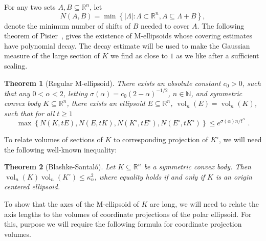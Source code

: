 \documentclass[12pt]{article}
\newtheorem{theorem}{Theorem}
\newcommand{\R}{{\mathbb{R}}}
\newcommand{\N}{{\mathbb{N}}}
\newcommand{\set}[1]{\left\{ #1 \right\}}
\DeclareMathOperator{\vol}{vol}
\begin{document}
For any two sets $A,B \subseteq \R^n$, let 
\[
N(A,B) = \min \set{|\Lambda|: \Lambda \subset \R^n, A \subseteq \Lambda+B} ,
\]
denote the minimum number of shifts of $B$ needed to cover $A$. The following
theorem of Pisier~\cite{Pisier-book}, gives the existence of M-ellipsoids whose
covering estimates have polynomial decay. The decay estimate will be used to
make the Gaussian measure of the large section of $K$ we find as close to $1$ as
we like after a sufficient scaling. 

\begin{theorem}[Regular M-ellipsoid]
There exists an absolute constant $c_0 > 0$, such that any $0 < \alpha < 2$,
letting $\sigma(\alpha) = c_0(2-\alpha)^{-1/2}$, $n \in \N$, and symmetric
convex body $K \subseteq \R^n$, there exists an ellipsoid $E \subseteq \R^n$,
$\vol_n(E)=\vol_n(K)$, such that for all $t \geq 1$
\[
\max \set{N(K,tE),N(E,tK),N(K^\circ,tE^\circ),N(E^\circ,tK^\circ)} \leq
e^{\sigma(\alpha) n / t^\alpha} \text{ .}
\]
\end{theorem}

To relate volumes of sections of $K$ to corresponding projection of $K^\circ$,
we will need the following well-known inequality:

\begin{theorem}[Blashke-Santal{\'o}]\label{thm:santalo} 
Let $K \subseteq \R^n$ be a symmetric convex body. Then $\vol_n(K)
\vol_n(K^\circ) \leq \kappa_n^2$, where equality holds if and only if $K$ is
an origin centered ellipsoid. 
\end{theorem}

To show that the axes of the M-ellipsoid of $K$ are long, we will need to relate
the axis lengths to the volumes of coordinate projections of the polar
ellipsoid. For this, purpose we will require the following formula for
coordinate projection volumes. 
\end{document}
